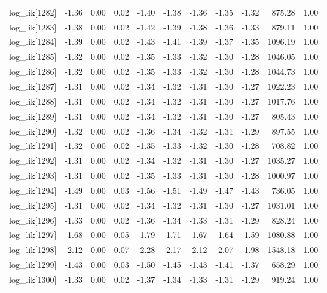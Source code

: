 \begin{table}[ht]
\begin{tabular}{rrrrrrrrrrr}
  log\_lik[1282] & -1.36 & 0.00 & 0.02 & -1.40 & -1.38 & -1.36 & -1.35 & -1.32 & 875.28 & 1.00 \\ 
  log\_lik[1283] & -1.38 & 0.00 & 0.02 & -1.42 & -1.39 & -1.38 & -1.36 & -1.33 & 879.11 & 1.00 \\ 
  log\_lik[1284] & -1.39 & 0.00 & 0.02 & -1.43 & -1.41 & -1.39 & -1.37 & -1.35 & 1096.19 & 1.00 \\ 
  log\_lik[1285] & -1.32 & 0.00 & 0.02 & -1.35 & -1.33 & -1.32 & -1.30 & -1.28 & 1046.05 & 1.00 \\ 
  log\_lik[1286] & -1.32 & 0.00 & 0.02 & -1.35 & -1.33 & -1.32 & -1.30 & -1.28 & 1044.73 & 1.00 \\ 
  log\_lik[1287] & -1.31 & 0.00 & 0.02 & -1.34 & -1.32 & -1.31 & -1.30 & -1.27 & 1022.23 & 1.00 \\ 
  log\_lik[1288] & -1.31 & 0.00 & 0.02 & -1.34 & -1.32 & -1.31 & -1.30 & -1.27 & 1017.76 & 1.00 \\ 
  log\_lik[1289] & -1.31 & 0.00 & 0.02 & -1.34 & -1.32 & -1.31 & -1.30 & -1.27 & 805.43 & 1.00 \\ 
  log\_lik[1290] & -1.32 & 0.00 & 0.02 & -1.36 & -1.34 & -1.32 & -1.31 & -1.29 & 897.55 & 1.00 \\ 
  log\_lik[1291] & -1.32 & 0.00 & 0.02 & -1.35 & -1.33 & -1.32 & -1.30 & -1.28 & 708.82 & 1.00 \\ 
  log\_lik[1292] & -1.31 & 0.00 & 0.02 & -1.34 & -1.32 & -1.31 & -1.30 & -1.27 & 1035.27 & 1.00 \\ 
  log\_lik[1293] & -1.31 & 0.00 & 0.02 & -1.35 & -1.33 & -1.31 & -1.30 & -1.28 & 1000.97 & 1.00 \\ 
  log\_lik[1294] & -1.49 & 0.00 & 0.03 & -1.56 & -1.51 & -1.49 & -1.47 & -1.43 & 736.05 & 1.00 \\ 
  log\_lik[1295] & -1.31 & 0.00 & 0.02 & -1.34 & -1.32 & -1.31 & -1.30 & -1.27 & 1031.01 & 1.00 \\ 
  log\_lik[1296] & -1.33 & 0.00 & 0.02 & -1.36 & -1.34 & -1.33 & -1.31 & -1.29 & 828.24 & 1.00 \\ 
  log\_lik[1297] & -1.68 & 0.00 & 0.05 & -1.79 & -1.71 & -1.67 & -1.64 & -1.59 & 1080.88 & 1.00 \\ 
  log\_lik[1298] & -2.12 & 0.00 & 0.07 & -2.28 & -2.17 & -2.12 & -2.07 & -1.98 & 1548.18 & 1.00 \\ 
  log\_lik[1299] & -1.43 & 0.00 & 0.03 & -1.50 & -1.45 & -1.43 & -1.41 & -1.37 & 658.29 & 1.00 \\ 
  log\_lik[1300] & -1.33 & 0.00 & 0.02 & -1.37 & -1.34 & -1.33 & -1.31 & -1.29 & 919.24 & 1.00 \\ 

\end{tabular}
\end{table}
